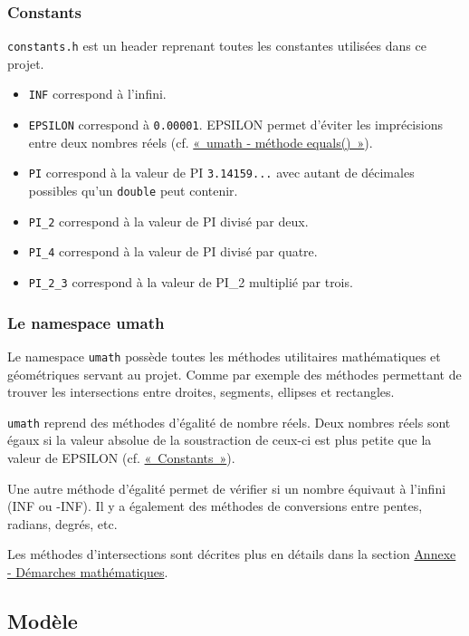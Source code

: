 \documentclass[]{report}
\begin{document}
\subsubsection{\label{Constants}Constants}

\texttt{constants.h} est un header reprenant toutes les constantes utilisées
dans ce projet. 

\begin{itemize}
    \item \texttt{INF} correspond à l'infini.
    \item \texttt{EPSILON} correspond à \texttt{0.00001}. EPSILON permet
        d'éviter les imprécisions entre deux nombres réels (cf. \hyperref[equals]{«~umath - méthode equals()~»}).
    \item \texttt{PI} correspond à la valeur de PI \texttt{3.14159...} avec
        autant de décimales possibles qu'un \texttt{double} peut contenir.
    \item \texttt{PI\_2} correspond à la valeur de PI divisé par deux.
    \item \texttt{PI\_4} correspond à la valeur de PI divisé par quatre.
    \item \texttt{PI\_2\_3} correspond à la valeur de PI\_2 multiplié par trois.
\end{itemize}

\subsubsection{Le namespace umath}

Le namespace \texttt{umath} possède toutes les méthodes utilitaires mathématiques
et géométriques servant au projet. Comme par exemple des méthodes permettant de trouver
les intersections entre droites, segments, ellipses et rectangles.

\label{equals}
\texttt{umath} reprend des méthodes d'égalité de nombre réels. Deux nombres réels sont égaux
si la valeur absolue de la soustraction de ceux-ci est plus petite que la valeur de EPSILON (cf. \hyperref[Constants]{«~Constants~»}).


Une autre méthode d’égalité permet de vérifier si un nombre équivaut à l’infini (INF ou -INF).
Il y a également des méthodes de conversions entre pentes, radians, degrés, etc.

Les méthodes d’intersections sont décrites plus en détails dans la section \hyperref[Annexe]{Annexe - Démarches mathématiques}.

\subsection{Modèle}
\end{document}
